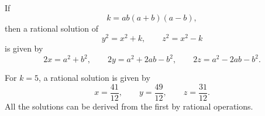 \begin{proposition}
If
\[
    k=ab(a+b)(a-b),
\]
then a rational solution of
\[
    y^2=x^2+k,\qquad z^2=x^2-k
\]
is given by
\[
    2x=a^2+b^2,\qquad 2y=a^2+2ab-b^2,\qquad
    2z=a^2-2ab-b^2.
\]
\end{proposition}

\begin{proposition}
For $k=5$, a rational solution is given by
\[
    x=\frac{41}{12},\qquad y=\frac{49}{12},\qquad z=\frac{31}{12}.
\]
All the solutions can be derived from the first by rational operations.
\end{proposition}
